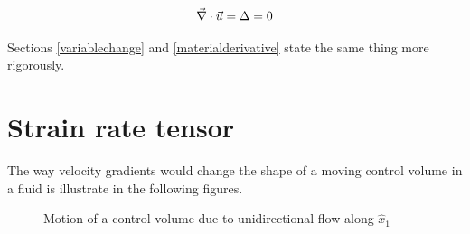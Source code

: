 \begin{equation}
\vec{\nabla}\cdot\vec{u}  = \Delta = 0
\end{equation} 

Sections \ref{variablechange} and \ref{materialderivative} state the same thing more rigorously.


\section{Strain rate tensor}

The way velocity gradients would change the shape of a moving control volume in a fluid is illustrate in the following figures.

\begin{figure}[h]
\begin{center}
\end{center}
\caption{Motion of a control volume due to unidirectional flow along $\hat{x}_1$}
\label{CVTranslation1}
\end{figure}



